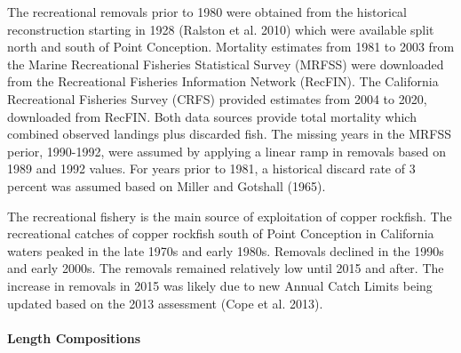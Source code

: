 \documentclass[11pt,
  english,
  a4paper,
]{article}
\begin{document}

The recreational removals prior to 1980 were obtained from the historical reconstruction starting in 1928 {(Ralston et al. 2010)\leavevmode\tagmcend\tagstructend} which were available split north and south of Point Conception. Mortality estimates from 1981 to 2003 from the Marine Recreational Fisheries Statistical Survey (MRFSS) were downloaded from the Recreational Fisheries Information Network (RecFIN). The California Recreational Fisheries Survey (CRFS) provided estimates from 2004 to 2020, downloaded from RecFIN. Both data sources provide total mortality which combined observed landings plus discarded fish. The missing years in the MRFSS perior, 1990-1992, were assumed by applying a linear ramp in removals based on 1989 and 1992 values. For years prior to 1981, a historical discard rate of 3 percent was assumed based on Miller and Gotshall {(1965)\leavevmode\tagmcend\tagstructend}.

\leavevmode\tagmcend\tagstructend\par


The recreational fishery is the main source of exploitation of copper rockfish. The recreational catches of copper rockfish south of Point Conception in California waters peaked in the late 1970s and early 1980s. Removals declined in the 1990s and early 2000s. The removals remained relatively low until 2015 and after. The increase in removals in 2015 was likely due to new Annual Catch Limits being updated based on the 2013 assessment {(Cope et al. 2013)\leavevmode\tagmcend\tagstructend}.

\leavevmode\tagmcend\tagstructend\par


\hypertarget{length-compositions-1}{%
\paragraph{Length Compositions}\label{length-compositions-1}}

\leavevmode\tagmcend\tagstructend

\end{document}
